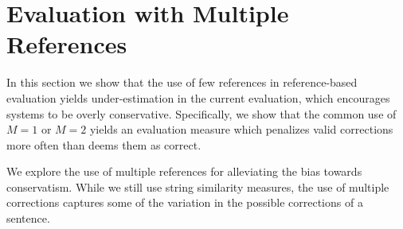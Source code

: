 \documentclass[english]{article}
\begin{document}



\section{Evaluation with Multiple References}\label{sec:increase-reference}

In this section we show that the use of few references in reference-based evaluation yields
under-estimation in the current evaluation, which encourages systems to be overly conservative.
Specifically, we show that the common use of $M=1$ or $M=2$ yields an evaluation
measure which penalizes valid corrections more often than deems them as correct.

We explore the use of multiple references for alleviating the bias towards conservatism.
While we still use string similarity measures, the use of multiple corrections captures
some of the variation in the possible corrections of a sentence.

\end{document}
